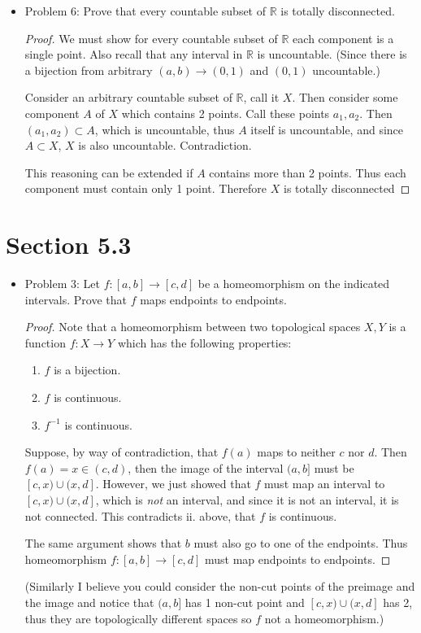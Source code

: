 \documentclass[hidelinks,12pt]{article}
\theoremstyle{definition}
\renewcommand{\skip}{\par\null\par}
\newcommand{\R}{\mathbb{R}}
\begin{document}
\begin{itemize}
\begin{enumerate}[label=(\alph*)]
    \end{enumerate}
    \item Problem 6: Prove that every countable subset of $\R$ is totally disconnected.\begin{proof}We must show for every countable subset of $\R$ each component is a single point. Also recall that any interval in $\R$ is uncountable. (Since there is a bijection from arbitrary $(a,b)\to(0,1)$ and $(0,1)$ uncountable.)\skip Consider an arbitrary countable subset of $\R$, call it $X$. Then consider some component $A$ of $X$ which contains 2 points. Call these points $a_1,a_2$. Then $(a_1,a_2)\subset A$, which is uncountable, thus $A$ itself is uncountable, and since $A\subset X$, $X$ is also uncountable. Contradiction.\skip This reasoning can be extended if $A$ contains more than 2 points. Thus each component must contain only 1 point. Therefore $X$ is totally disconnected
    \end{proof}
\end{itemize}
\section{Section 5.3}
\begin{itemize}
    \item Problem 3: Let $f:[a,b]\to[c,d]$ be a homeomorphism on the indicated intervals. Prove that $f$ maps endpoints to endpoints.
    \begin{proof}
    Note that a homeomorphism between two topological spaces $X,Y$ is a function $f:X\to Y$ which has the following properties:\begin{enumerate}[label=\roman*.]
        \item $f$ is a bijection.
        \item $f$ is continuous.
        \item $f^{-1}$ is continuous.
    \end{enumerate}\skip Suppose, by way of contradiction, that $f(a)$ maps to neither $c$ nor $d$. Then $f(a)=x\in(c,d)$, then the image of the interval $(a,b]$ must be $[c,x)\cup(x,d]$. However, we just showed that $f$ must map an interval to $[c,x)\cup(x,d]$, which is \emph{not} an interval, and since it is not an interval, it is not connected. This contradicts ii. above, that $f$ is continuous.\skip The same argument shows that $b$ must also go to one of the endpoints. Thus homeomorphism $f:[a,b]\to[c,d]$ must map endpoints to endpoints.
    \end{proof}
    (Similarly I believe you could consider the non-cut points of the preimage and the image and notice that $(a,b]$ has 1 non-cut point and $[c,x)\cup(x,d]$ has 2, thus they are topologically different spaces so $f$ not a homeomorphism.)
\end{itemize}
\end{document}
